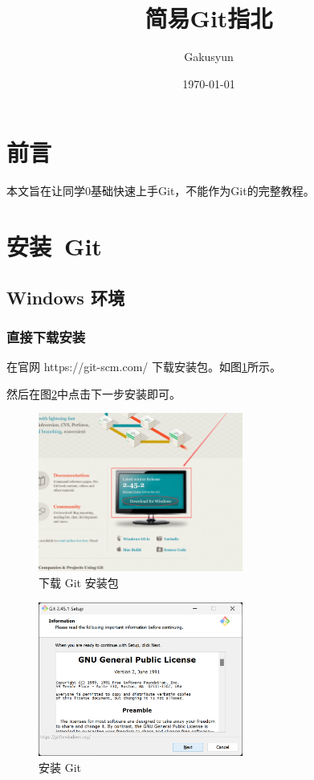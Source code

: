 \documentclass[UTF8]{ctexart}
\title{简易Git指北}
\author{Gakusyun}
\date{\today}
\begin{document}
\maketitle
\thispagestyle{empty}
\newpage
\tableofcontents
\thispagestyle{empty}
\newpage
\setcounter{page}{1}
\section{前言}
本文旨在让同学0基础快速上手Git，不能作为Git的完整教程。
\newpage
\section{安装\ Git}
\subsection{Windows 环境}
\subsubsection{直接下载安装}
在官网 https://git-scm.com/ 下载安装包。如图\ref{install:downloadGit-Windows}所示。

然后在图\ref{install:gitinstaller}中点击下一步安装即可。
\begin{figure}[h]
    \centering
    \includegraphics[width=0.6\textwidth]{./img/downloadGit-Windows}
    \caption{下载 Git 安装包}
    \label{install:downloadGit-Windows}
\end{figure}
\begin{figure}[h]
    \centering
    \includegraphics[width=0.6\textwidth]{./img/gitinstaller}
    \caption{安装 Git}
    \label{install:gitinstaller}
\end{figure}
\end{document}
